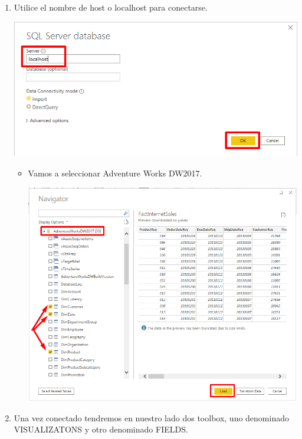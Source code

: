 \documentclass[12pt,letterpaper]{article}
\newcommand\tab[1][1cm]{\hspace*{#1}}
\begin{document}
\begin{enumerate}[\tab 1.]
\begin{center}
        \end{center}
        \item Utilice el nombre de host o localhost para conectarse.
        \begin{center}
            \includegraphics[width=13cm]{./img/img3.png}
        \end{center}
        \begin{itemize}
            \item Vamos a seleccionar Adventure Works DW2017.
            \begin{center}
                \includegraphics[width=13cm]{./img/img3.1.png}
            \end{center}
        \end{itemize}
        \item Una vez conectado tendremos en nuestro lado dos toolbox, uno denominado VISUALIZATONS y otro denominado FIELDS.
        \begin{center}

\end{center}
\end{enumerate}
\end{document}
